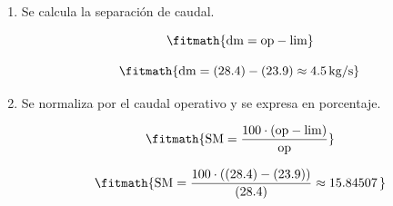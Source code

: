 \begin{enumerate}

\item Se calcula la separación de caudal.

\[\fitmath{\mathrm{dm}=\mathrm{op}-\mathrm{lim}}\]

\[\fitmath{\mathrm{dm}=(28.4)-(23.9)\approx 4.5\,\mathrm{kg/s}}\]

\item Se normaliza por el caudal operativo y se expresa en porcentaje.

\[\fitmath{\mathrm{SM}=\frac{100\cdot \left(\mathrm{op}-\mathrm{lim}\right)}{\mathrm{op}}}\]

\[\fitmath{\mathrm{SM}=\frac{100\cdot \left((28.4)-(23.9)\right)}{(28.4)}\approx 15.84507\,}\]

\end{enumerate}
